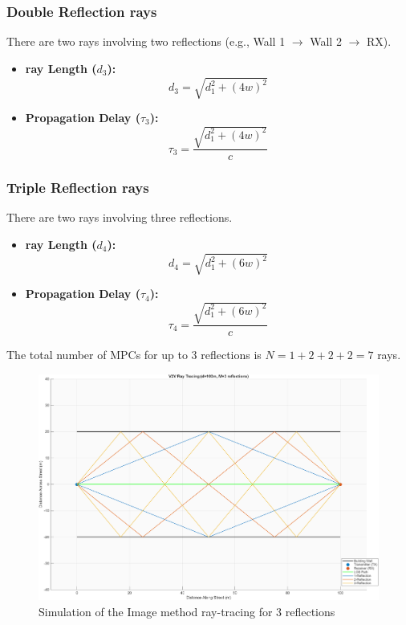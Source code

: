 \subsubsection{Double Reflection rays}
There are two rays involving two reflections (e.g., Wall 1 $\rightarrow$ Wall 2 $\rightarrow$ RX).
\begin{itemize}
	\item \textbf{ray Length ($d_3$):}
	\begin{equation}
		d_3 = \sqrt{d_1^2 + (4w)^2}
	\end{equation}
	\item \textbf{Propagation Delay ($\tau_{3}$):}
	\begin{equation}
		\tau_{3} = \frac{\sqrt{d_1^2 + (4w)^2}}{c}
	\end{equation}
\end{itemize}

\subsubsection{Triple Reflection rays}
There are two rays involving three reflections.
\begin{itemize}
	\item \textbf{ray Length ($d_4$):}
	\begin{equation}
		d_4 = \sqrt{d_1^2 + (6w)^2}
	\end{equation}
	\item \textbf{Propagation Delay ($\tau_{4}$):}
	\begin{equation}
		\tau_{4} = \frac{\sqrt{d_1^2 + (6w)^2}}{c}
	\end{equation}
\end{itemize}
The total number of MPCs for up to 3 reflections is $N=1+2+2+2=7$ rays.

\begin{figure}[H]
	\centering
	\includegraphics[width=\linewidth]{content/4-images/ray-tracing-3-reflect}
	\caption{Simulation of the Image method ray-tracing for 3 reflections}
	\label{fig:raytracing-3reflex}
\end{figure}


